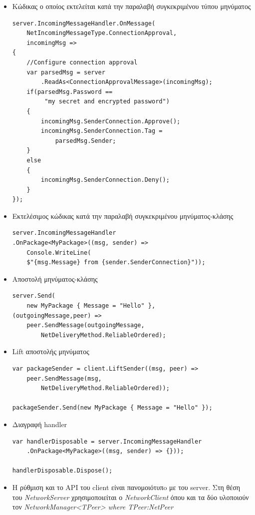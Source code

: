 \documentclass[oneside, 12pt]{book}
\begin{document}
\begin{itemize}
		\item Κώδικας ο οποίος εκτελείται κατά την παραλαβή συγκεκριμένου τύπου μηνύματος
		\lstset{style=sharpc}
		\begin{lstlisting}
server.IncomingMessageHandler.OnMessage(
	NetIncomingMessageType.ConnectionApproval, 
	incomingMsg =>
{
	//Configure connection approval
	var parsedMsg = server
		.ReadAs<ConnectionApprovalMessage>(incomingMsg);
	if(parsedMsg.Password ==
		 "my secret and encrypted password")
	{
		incomingMsg.SenderConnection.Approve();
		incomingMsg.SenderConnection.Tag = 
			parsedMsg.Sender;
	}
	else
	{
		incomingMsg.SenderConnection.Deny();
	}
});
		\end{lstlisting}
		\item Εκτελέσιμος κώδικας κατά την παραλαβή συγκεκριμένου μηνύματος-κλάσης
		\lstset{style=sharpc}
		\begin{lstlisting}
server.IncomingMessageHandler
.OnPackage<MyPackage>((msg, sender) => 
	Console.WriteLine(
	$"{msg.Message} from {sender.SenderConnection}"));
		\end{lstlisting}	
		\item Αποστολή μηνύματος-κλάσης
		\lstset{style=sharpc}
		\begin{lstlisting}
server.Send(
	new MyPackage { Message = "Hello" },
(outgoingMessage,peer) => 
	peer.SendMessage(outgoingMessage,
		NetDeliveryMethod.ReliableOrdered);
		\end{lstlisting}		
		\item Lift αποστολής μηνύματος
		\lstset{style=sharpc}
		\begin{lstlisting}
var packageSender = client.LiftSender((msg, peer) =>
	peer.SendMessage(msg, 
		NetDeliveryMethod.ReliableOrdered));
		
packageSender.Send(new MyPackage { Message = "Hello" });	
		\end{lstlisting}	
		\item Διαγραφή handler
		\lstset{style=sharpc}
		\begin{lstlisting}	
var handlerDisposable = server.IncomingMessageHandler
	.OnPackage<MyPackage>((msg, sender) => {}));
		
handlerDisposable.Dispose();	
		\end{lstlisting}		
		\item Η ρύθμιση και το API του client είναι πανομοιότυπo με του server. Στη θέση του \textit{NetworkServer} χρησιμοποιείται ο \textit{NetworkClient} όπου και τα δύο υλοποιούν τον \textit{NetworkManager<TPeer> where TPeer:NetPeer}		
	\end{itemize}
	
\end{document}
